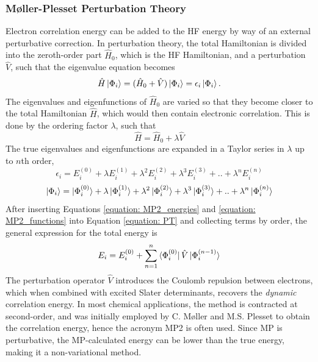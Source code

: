 \subsubsection{M{\o}ller-Plesset Perturbation Theory}
Electron correlation energy can be added to the \ac{HF} energy by way of an external perturbative correction. In perturbation theory, the total Hamiltonian is divided into the zeroth-order part $\hat{H}_{0}$, which is the \ac{HF} Hamiltonian, and a perturbation $\hat{V}$, such that the eigenvalue equation becomes
\begin{equation}\label{equation: PT}
    \hat{H}\ket{\Phi_{i}}=(\hat{H}_{0}+\hat{V})\ket{\Phi_{i}}=\epsilon_{i}\ket{\Phi_{i}}.
\end{equation}
The eigenvalues and eigenfunctions of $\hat{H}_{0}$ are varied so that they become closer to the total Hamiltonian $\hat{H}$, which would then contain electronic correlation. This is done by the ordering factor $\lambda$, such that
\begin{equation}
    \hat{H}=\hat{H}_{0}+\lambda\hat{V}
\end{equation}
The true eigenvalues and eigenfunctions are expanded in a Taylor series in $\lambda$ up to $n$th order,
\begin{equation}\label{equation: MP2_energies}
    \epsilon_{i}=E_{i}^{(0)}+\lambda{}E_{i}^{(1)}+\lambda^{2}E_{i}^{(2)}+\lambda^{3}E_{i}^{(3)}+..+\lambda^{n}E_{i}^{(n)}
\end{equation}
\begin{equation}\label{equation: MP2_functions}
    \ket{\Phi_{i}}=\ket{\Phi_{i}^{(0)}}+\lambda{}\ket{\Phi_{i}^{(1)}}+\lambda^{2}\ket{\Phi_{i}^{(2)}}+\lambda^{3}\ket{\Phi_{i}^{(3)}}+..+\lambda^{n}\ket{\Phi_{i}^{(n)}}
\end{equation}
After inserting Equations \ref{equation: MP2_energies} and \ref{equation: MP2_functions} into Equation \ref{equation: PT} and collecting terms by order, the general expression for the total energy is
\begin{equation}
E_{i}=E_{i}^{(0)}+\sum_{n=1}^{n}\bra{\Phi_{i}^{(0)}}\hat{V}\ket{\Phi_{i}^{(n-1)}}
\end{equation}
The perturbation operator $\hat{V}$ introduces the Coulomb repulsion between electrons, which when combined with excited Slater determinants, recovers the \textit{dynamic} correlation energy. In most chemical applications, the method is contracted at second-order, and was initially employed by C. M{\o}ller and M.S. Plesset to obtain the correlation energy, hence the acronym \ac{MP2} is often used.\cite{Moller1934} Since MP is perturbative, the MP-calculated energy can be lower than the true energy, making it a non-variational method.
